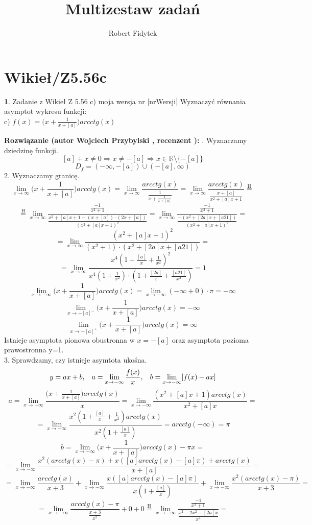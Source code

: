\documentclass[12pt, a4paper]{article}
\title{Multizestaw zadań}
\author{Robert Fidytek}
\date{}
\theoremstyle{definition} %
\newtheorem{zad}{}
\newcommand{\kategoria}[1]{\section{#1}} %
\newcommand{\zadStart}[1]{\begin{zad}#1\newline} %
\newcommand{\zadStop}{\end{zad}}   %
\newcommand{\rozwStart}[2]{\noindent \textbf{Rozwiązanie (autor #1 , recenzent #2): }\newline} %
\begin{document}
\maketitle


\kategoria{Wikieł/Z5.56c}
\zadStart{Zadanie z Wikieł Z 5.56 c) moja wersja nr [nrWersji]}
Wyznaczyć równania asymptot wykresu funkcji:\\
c) $f(x)=\big( x+\frac{1}{x+[a]}\big) arcctg(x)$
\zadStop
\rozwStart{Wojciech Przybylski}{}
1. Wyznaczamy dziedzinę funkcji.
$$[a]+x\neq0 \Rightarrow x\neq-[a] \Rightarrow x\in\mathbb{R}\setminus\{-[a]\}$$
$$D_{f}=(-\infty,-[a])\cup(-[a],\infty)$$
2. Wyznaczamy granicę. 
$$\lim_{x\to\infty}\big( x+\frac{1}{x+[a]}\big) arcctg(x)=\lim_{x\to\infty}\frac{arcctg(x)}{\frac{1}{x+\frac{1}{x+[a]}}}=\lim_{x\to\infty}\frac{arcctg(x)}{\frac{x+[a]}{x^{2}+[a]x+1}}\stackrel{\text{H}}{=}$$
$$\stackrel{\text{H}}{=}\lim_{x\to\infty}\frac{\frac{-1}{x^{2}+1}}{\frac{x^{2}+[a]x+1-(x+[a])\cdot(2x+[a])}{(x^{2}+[a]x+1)^{2}}}=\lim_{x\to\infty}\frac{\frac{-1}{x^{2}+1}}{\frac{-(x^{2}+[2a]x+[a21])}{(x^{2}+[a]x+1)^{2}}}=$$
$$=\lim_{x\to\infty}\frac{(x^{2}+[a]x+1)^{2}}{(x^{2}+1)\cdot(x^{2}+[2a]x+[a21])}=$$
$$=\lim_{x\to\infty}\frac{x^{4}(1+\frac{[a]}{x}+\frac{1}{x^{2}})^{2}}{x^{4}(1+\frac{1}{x^{2}})\cdot(1+\frac{[2a]}{x}+\frac{[a21]}{x^{2}})}=1$$
$$\lim_{x\to-\infty}\big( x+\frac{1}{x+[a]}\big) arcctg(x)=\lim_{x\to-\infty}(-\infty+0)\cdot\pi=-\infty$$
$$\lim_{x\to-[a]^{-}}\big( x+\frac{1}{x+[a]}\big) arcctg(x)=-\infty$$
$$\lim_{x\to-[a]^{+}}\big( x+\frac{1}{x+[a]}\big) arcctg(x)=\infty$$
Istnieje asymptota pionowa obustronna w $x=-[a]$ oraz asymptota pozioma prawostronna y=1.\\
3. Sprawdzamy, czy istnieje asymtota ukośna.
$$y=ax+b,\hspace{3mm}a=\lim_{x\to-\infty}\frac{f(x)}{x},\hspace{3mm}b=\lim_{x\to-\infty}[f(x)-ax]$$
$$a=\lim_{x\to-\infty}\frac{\big( x+\frac{1}{x+[a]}\big) arcctg(x)}{x}=\lim_{x\to-\infty}\frac{(x^{2}+[a]x+1)arcctg(x)}{x^{2}+[a]x}=$$
$$=\lim_{x\to-\infty}\frac{x^{2}(1+\frac{[a]}{x}+\frac{1}{x^{2}})arcctg(x)}{x^{2}(1+\frac{[a]}{x})}=arcctg(-\infty)=\pi$$
$$b=\lim_{x\to-\infty}\big( x+\frac{1}{x+[a]}\big)arcctg(x)-\pi x=$$
$$=\lim_{x\to-\infty}\frac{x^{2}(arcctg(x)-\pi)+x([a]arcctg(x)-[a]\pi)+arcctg(x)}{x+[a]}=$$
$$=\lim_{x\to-\infty}\frac{arcctg(x)}{x+3}+\lim_{x\to-\infty}\frac{x([a]arcctg(x)-[a]\pi)}{x(1+\frac{[a]}{x})}+\lim_{x\to-\infty}\frac{x^{2}(arcctg(x)-\pi)}{x+3}=$$
$$=\lim_{x\to-\infty}\frac{arcctg(x)-\pi}{\frac{x+3}{x^{2}}}+0+0\stackrel{\text{H}}{=}\lim_{x\to-\infty}\frac{\frac{-1}{x^{2}+1}}{\frac{x^{2}-2x^{2}-[2a]x}{x^{4}}}=$$
\end{document}

